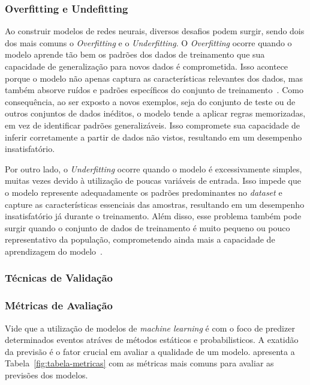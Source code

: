         \subsubsection{Overfitting e Undefitting}
            Ao construir modelos de redes neurais, diversos desafios podem surgir, sendo dois dos mais comuns o 
            \emph{Overfitting} e o \emph{Underfitting}. O \emph{Overfitting} ocorre quando o modelo aprende tão 
            bem os padrões dos dados de treinamento que sua capacidade de generalização para novos dados é 
            comprometida. Isso acontece porque o modelo não apenas captura as características relevantes dos dados, 
            mas também absorve ruídos e padrões específicos do conjunto de treinamento~\cite{montesinos2022}. 
            Como consequência, ao ser exposto a novos exemplos, seja do conjunto de teste ou de outros conjuntos de 
            dados inéditos, o modelo tende a aplicar regras memorizadas, em vez de identificar padrões generalizáveis. 
            Isso compromete sua capacidade de inferir corretamente a partir de dados não vistos, resultando em um 
            desempenho insatisfatório.

            Por outro lado, o \emph{Underfitting} ocorre quando o modelo é excessivamente simples, muitas vezes 
            devido à utilização de poucas variáveis de entrada. Isso impede que o modelo represente adequadamente 
            os padrões predominantes no \emph{dataset} e capture as características essenciais das amostras, 
            resultando em um desempenho insatisfatório já durante o treinamento. Além disso, esse problema também 
            pode surgir quando o conjunto de dados de treinamento é muito pequeno ou pouco representativo da 
            população, comprometendo ainda mais a capacidade de aprendizagem do modelo~\cite{montesinos2022}.
            
        

        \subsubsection{Técnicas de Validação}

        \subsubsection{Métricas de Avaliação}
            Vide que a utilização de modelos de \emph{machine learning} é com o foco de predizer determinados eventos atráves
            de métodos estáticos e probabilisticos. A exatidão da previsão é o fator crucial em avaliar a qualidade de um modelo.
             apresenta a Tabela~\ref{fig:tabela-metricas} com as métricas mais comuns para avaliar as previsões
            dos modelos.
            
